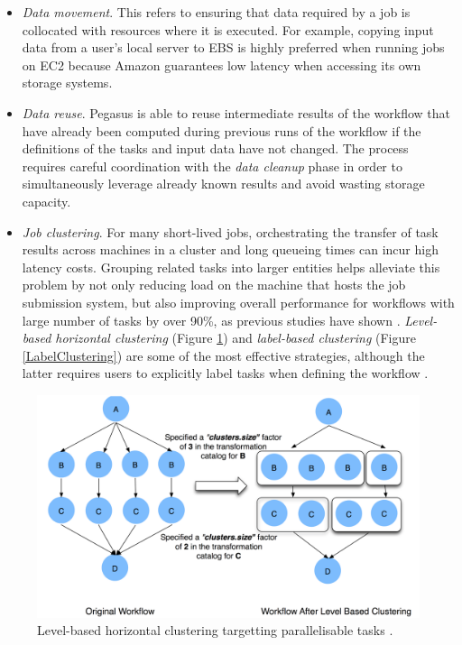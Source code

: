 \documentclass[11pt,a4paper]{report}
\begin{document}
\begin{itemize}
	\item \textit{Data movement}. This refers to ensuring that data required by a job is collocated with resources where it is executed. For example, copying input data from a user's local server to EBS is highly preferred when running jobs on EC2 because Amazon guarantees low latency when accessing its own storage systems.
	\item \textit{Data reuse}. Pegasus is able to reuse intermediate results of the workflow that have already been computed during previous runs of the workflow if the definitions of the tasks and input data have not changed. The process requires careful coordination with the \textit{data cleanup} phase in order to simultaneously leverage already known results and avoid wasting storage capacity.
	\item \textit{Job clustering}. For many short-lived jobs, orchestrating the transfer of task results across machines in a cluster and long queueing times can incur high latency costs. Grouping related tasks into larger entities helps alleviate this problem by not only reducing load on the machine that hosts the job submission system, but also improving overall performance for workflows with large number of tasks by over 90\%, as previous studies have shown \cite{Deelman2010, Singh2008}. \textit{Level-based horizontal clustering} (Figure \ref{HorizontalClustering}) and \textit{label-based clustering} (Figure \ref{LabelClustering}) are some of the most effective strategies, although the latter requires users to explicitly label tasks when defining the workflow \cite{Deelman2013}.
\end{itemize}
	
\vspace{5mm}
\begin{figure}[h]
	\centering
		\includegraphics[scale=0.23]{figures/HorizontalClustering.png}
	\caption{Level-based horizontal clustering targetting parallelisable tasks \cite{Deelman2013}.}
	\label{HorizontalClustering}
\end{figure}
\end{document}
